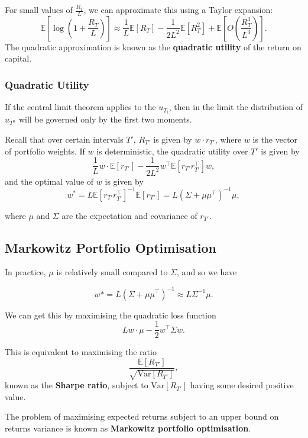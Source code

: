 \documentclass{article}
\begin{document}
For small values of $\frac{R_T}{L}$, we can approximate this using a Taylor expansion:
$$\mathbb{E}[\log (1 + \frac{R_T}{L})] \approx \frac{1}{L}\mathbb{E}[R_T] - \frac{1}{2L^2}\mathbb{E}[R_T^2] + \mathbb{E}[O(\frac{R_T^3}{L^3})].$$
The quadratic approximation is known as the \textbf{quadratic utility} of the return on capital.

\subsubsection{Quadratic Utility}
If the central limit theorem applies to the $u_{T_i}$, then in the limit the distribution of $u_{T^n}$ will be governed only by the first two moments.

Recall that over certain intervals $T'$, $R_{T'}$ is given by $w \cdot r_{T'}$, where $w$ is the vector of portfolio weights. If $w$ is deterministic, the quadratic utility over $T'$ is given by
$$\frac{1}{L} w \cdot \mathbb{E}[r_{T'}] - \frac{1}{2L^2} w^\top \mathbb{E}[r_{T'} r_{T'}^\top] w,$$
and the optimal value of $w$ is given by
$$w^* = L \mathbb{E}[r_{T'} r_{T'}^\top]^{-1} \mathbb{E}[r_{T'}] = L (\Sigma+\mu \mu^\top)^{-1}\mu,$$

where $\mu$ and $\Sigma$ are the expectation and covariance of $r_{T'}$.

\subsection{Markowitz Portfolio Optimisation}
In practice, $\mu$ is relatively small compared to $\Sigma$, and so we have

$$w* = L(\Sigma+\mu\mu^\top)^{-1}\approx L\Sigma^{-1}\mu.$$

We can get this by maximising the quadratic loss function
$$Lw\cdot \mu - \frac{1}{2}w^\top \Sigma w.$$

This is equivalent to maximising the ratio
$$\frac{\mathbb{E}[R_{T'}]}{\sqrt{\mathrm{Var}[R_{T'}]}},$$
known as the \textbf{Sharpe ratio}, subject to $\mathrm{Var}[R_{T'}]$ having some desired positive value. %

The problem of maximising expected returns subject to an upper bound on returns variance is known as \textbf{Markowitz portfolio optimisation}.%

\end{document}
